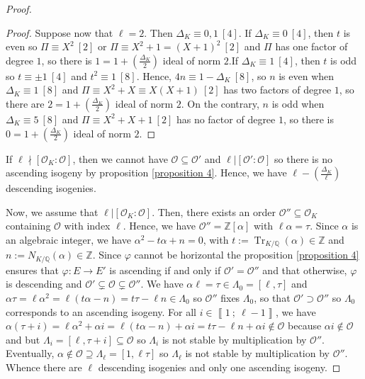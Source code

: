 \documentclass[a4paper,10pt]{report}
\theoremstyle{definition}
\theoremstyle{plain}
\theoremstyle{definition}
\newcommand{\Z}{\mathbb{Z}}
\newcommand{\Q}{\mathbb{Q}}
\newcommand{\mO}{\mathcal{O}}
\renewcommand{\i}[2]{\left\llbracket #1~;~#2\right\rrbracket}
\renewcommand{\(}{\left(}
\renewcommand{\)}{\right)}
\DeclareMathOperator{\Tr}{Tr}
\begin{document}
\begin{proof}
\begin{proof}
Suppose now that $\ell=2$. Then $\Delta_K\equiv 0, 1 \ [4]$. If $\Delta_K\equiv 0 \ [4]$, then $t$ is even so $\Pi\equiv X^2 \ [2]$ or $\Pi\equiv X^2+1=(X+1)^2 \ [2]$ and $\Pi$ has one factor of degree $1$, so there is $1=1+\(\frac{\Delta_K}{2}\)$ ideal of norm $2$.If $\Delta_K\equiv 1 \ [4]$, then $t$ is odd so $t\equiv \pm 1 \ [4]$ and $t^2\equiv 1 \ [8]$. Hence, $4n\equiv 1-\Delta_K \ [8]$, so $n$ is even when $\Delta_K\equiv 1 \ [8]$ and $\Pi\equiv X^2+X\equiv X(X+1) \ [2]$ has two factors of degree $1$, so there are $2=1+\(\frac{\Delta_K}{2}\)$ ideal of norm $2$.  On the contrary, $n$ is odd when $\Delta_K\equiv 5 \ [8]$ and $\Pi\equiv X^2+X+1\ [2]$ has no factor of degree $1$, so there is $0=1+\(\frac{\Delta_K}{2}\)$ ideal of norm $2$.
\end{proof}

If $\ell\nmid [\mO_K:\mO]$, then we cannot have $\mO\subseteq\mO'$ and $\ell|[\mO':\mO]$ so there is no ascending isogeny by proposition \ref{proposition 4}. Hence, we have $\ell-\(\frac{\Delta_K}{\ell}\)$ descending isogenies.

Now, we assume that $\ell|[\mO_K:\mO]$. Then, there exists an order $\mO''\subseteq \mO_K$ containing $\mO$ with index $\ell$. Hence, we have $\mO''=\Z[\alpha]$ with $\ell\alpha=\tau$.  Since $\alpha$ is an algebraic integer, we have $\alpha^2-t\alpha+n=0$, with $t:=\Tr_{K/\Q}(\alpha)\in \Z$ and $n:=N_{K/\Q}(\alpha)\in \Z$. Since $\varphi$ cannot be horizontal the proposition \ref{proposition 4} ensures that $\varphi:E\longrightarrow E'$ is ascending if and only if $\mO'=\mO''$ and that otherwise, $\varphi$ is descending and $\mO'\subsetneq \mO\subsetneq \mO''$.  We have $\alpha\ell=\tau\in\Lambda_0=[\ell,\tau]$ and $\alpha\tau=\ell\alpha^2=\ell(t\alpha-n)=t\tau-\ell n\in \Lambda_0$ so $\mO''$ fixes $\Lambda_0$, so that $\mO'\supset\mO''$ so $\Lambda_0$ corresponds to an ascending isogeny.  For all $i\in\i{1}{\ell-1}$, we have $\alpha(\tau+i)=\ell\alpha^2+\alpha i=\ell(t\alpha-n)+\alpha i=t\tau-\ell n+\alpha i\not\in\mO$ because $\alpha i\not\in\mO$ and but $\Lambda_i=[\ell,\tau+i]\subseteq\mO$ so $\Lambda_i$ is not stable by multiplication by $\mO''$.  Eventually,  $\alpha\not\in \mO\supseteq \Lambda_\ell=[1,\ell\tau]$ so $\Lambda_\ell$ is not stable by multiplication by $\mO''$. Whence there are $\ell$ descending isogenies and only one ascending isogeny.


\end{proof}
\end{document}
